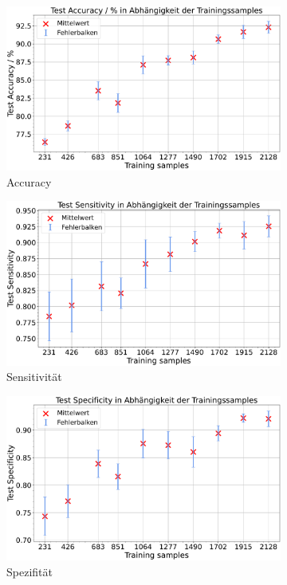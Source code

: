 \begin{figure}[htbp]
  \centering
  \begin{subfigure}[b]{0.48\textwidth}
    \centering
    \includegraphics[width=\textwidth]{plots/3-Messungen-Gli-Men_Accuracy_mean.pdf}
    \caption{Accuracy}
    \label{fig:gli-men-acc}
  \end{subfigure}
  \begin{subfigure}[b]{0.48\textwidth}
    \centering
    \includegraphics[width=\textwidth]{plots/3-Messungen-Gli-Men_Sensitivity_mean.pdf}
    \caption{Sensitivität}
    \label{fig:gli-men-sens}
  \end{subfigure}
  \begin{subfigure}[b]{0.48\textwidth}
    \centering
    \includegraphics[width=\textwidth]{plots/3-Messungen-Gli-Men_Specificity_mean.pdf}
    \caption{Spezifität}
    \label{fig:gli-men-spec}
  \end{subfigure}
  \caption{}
  \label{fig:gli-men-reduktion}
\end{figure}

